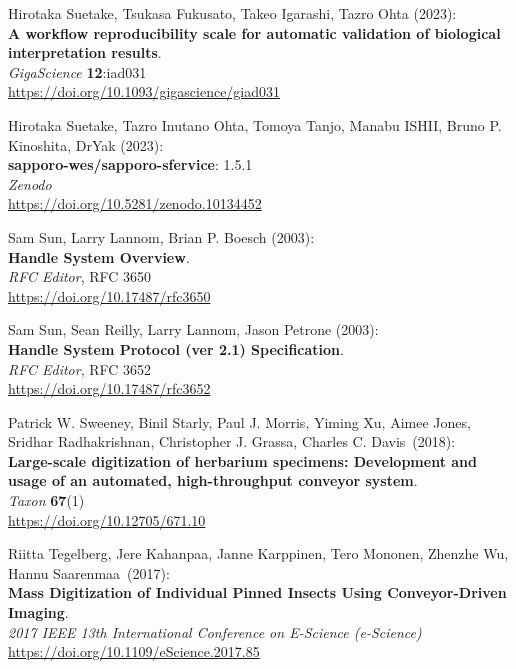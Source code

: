 \begin{thebibliography}{9}
Hirotaka Suetake, Tsukasa Fukusato, Takeo Igarashi, Tazro Ohta (2023):\\
\textbf{A workflow reproducibility scale for automatic validation of biological interpretation results}.\\
\emph{GigaScience} \textbf{12}:iad031\\
\url{https://doi.org/10.1093/gigascience/giad031}

Hirotaka Suetake, Tazro Inutano Ohta, Tomoya Tanjo, Manabu ISHII, Bruno P. Kinoshita, DrYak (2023):\\
\textbf{sapporo-wes/sapporo-sfervice}: 1.5.1\\
\emph{Zenodo}\\
\url{https://doi.org/10.5281/zenodo.10134452}


Sam Sun, Larry Lannom, Brian P. Boesch (2003): \\
\textbf{Handle System Overview}.\\
\emph{RFC Editor}, RFC 3650\\
\url{https://doi.org/10.17487/rfc3650}

Sam Sun, Sean Reilly, Larry Lannom, Jason Petrone (2003):\\
\textbf{Handle System Protocol (ver 2.1) Specification}.\\
\emph{RFC Editor}, RFC 3652\\
\url{https://doi.org/10.17487/rfc3652}

Patrick W. Sweeney, Binil Starly, Paul J. Morris, Yiming Xu, Aimee Jones, Sridhar Radhakrishnan, Christopher J. Grassa, Charles C. Davis~(2018):\\
\textbf{Large-scale digitization of herbarium specimens: Development and usage of an
automated, high-throughput conveyor system}.\\
\emph{Taxon} \textbf{67}(1)\\
\url{https://doi.org/10.12705/671.10}

Riitta Tegelberg, Jere Kahanpaa, Janne Karppinen, Tero Mononen, Zhenzhe Wu, Hannu Saarenmaa~(2017):\\
\textbf{Mass Digitization of Individual Pinned Insects Using Conveyor-Driven Imaging}.\\
\emph{2017 IEEE 13th International Conference on E-Science (e-Science)}\\
\url{https://doi.org/10.1109/eScience.2017.85}


\end{thebibliography}
